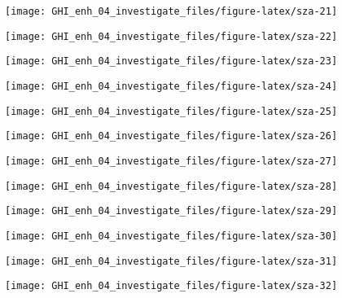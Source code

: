 \documentclass[
  10pt,
  a4paper,oneside]{article}
\begin{document}
\begin{center}\texttt{[image: GHI\_enh\_04\_investigate\_files/figure-latex/sza-21]} \end{center}

\begin{center}\texttt{[image: GHI\_enh\_04\_investigate\_files/figure-latex/sza-22]} \end{center}

\begin{center}\texttt{[image: GHI\_enh\_04\_investigate\_files/figure-latex/sza-23]} \end{center}

\begin{center}\texttt{[image: GHI\_enh\_04\_investigate\_files/figure-latex/sza-24]} \end{center}

\begin{center}\texttt{[image: GHI\_enh\_04\_investigate\_files/figure-latex/sza-25]} \end{center}

\begin{center}\texttt{[image: GHI\_enh\_04\_investigate\_files/figure-latex/sza-26]} \end{center}

\begin{center}\texttt{[image: GHI\_enh\_04\_investigate\_files/figure-latex/sza-27]} \end{center}

\begin{center}\texttt{[image: GHI\_enh\_04\_investigate\_files/figure-latex/sza-28]} \end{center}

\begin{center}\texttt{[image: GHI\_enh\_04\_investigate\_files/figure-latex/sza-29]} \end{center}

\begin{center}\texttt{[image: GHI\_enh\_04\_investigate\_files/figure-latex/sza-30]} \end{center}

\begin{center}\texttt{[image: GHI\_enh\_04\_investigate\_files/figure-latex/sza-31]} \end{center}

\begin{center}\texttt{[image: GHI\_enh\_04\_investigate\_files/figure-latex/sza-32]} \end{center}
\end{document}
